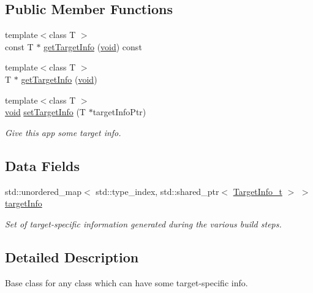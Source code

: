 \subsection*{Public Member Functions}
\begin{DoxyCompactItemize}
\item 
{\footnotesize template$<$class T $>$ }\\const T $\ast$ \hyperlink{struct_has_target_info__t_a5f251e572a9cbbd83f4c9693eb967fb1}{get\+Target\+Info} (\hyperlink{_t_e_m_p_l_a_t_e__cdef_8h_ac9c84fa68bbad002983e35ce3663c686}{void}) const 
\item 
{\footnotesize template$<$class T $>$ }\\T $\ast$ \hyperlink{struct_has_target_info__t_a921adaec124e9d99f6af9e82d02b1d5d}{get\+Target\+Info} (\hyperlink{_t_e_m_p_l_a_t_e__cdef_8h_ac9c84fa68bbad002983e35ce3663c686}{void})
\item 
{\footnotesize template$<$class T $>$ }\\\hyperlink{_t_e_m_p_l_a_t_e__cdef_8h_ac9c84fa68bbad002983e35ce3663c686}{void} \hyperlink{struct_has_target_info__t_ab96e937639ff5ed4c6b0c4ac82f908b6}{set\+Target\+Info} (T $\ast$target\+Info\+Ptr)
\begin{DoxyCompactList}\small\item\em Give this app some target info. \end{DoxyCompactList}\end{DoxyCompactItemize}
\subsection*{Data Fields}
\begin{DoxyCompactItemize}
\item 
std\+::unordered\+\_\+map$<$ std\+::type\+\_\+index, std\+::shared\+\_\+ptr$<$ \hyperlink{class_target_info__t}{Target\+Info\+\_\+t} $>$ $>$ \hyperlink{struct_has_target_info__t_a2cdccf9b03ac2883694527fb288df699}{target\+Info}
\begin{DoxyCompactList}\small\item\em Set of target-\/specific information generated during the various build steps. \end{DoxyCompactList}\end{DoxyCompactItemize}


\subsection{Detailed Description}
Base class for any class which can have some target-\/specific info. 

